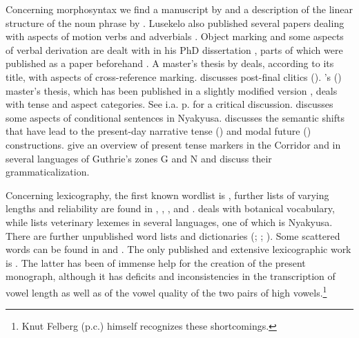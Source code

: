 Concerning morphosyntax we find a manuscript by \citet{DurantiA1977} and a description of the linear structure of the noun phrase by \citet{LusekeloA2009a}. Lusekelo also published several papers dealing with aspects of motion verbs \citep{LusekeloA2008} and adverbials \citep{LusekeloA2010}. Object marking and some aspects of verbal derivation are dealt with in his PhD dissertation \citep{LusekeloA2012}, parts of which were published as a paper beforehand \citep{LusekeloA2008a}. A master's thesis by \citet{HawkinsonA1976} deals, according to its title, with aspects of cross-reference marking. \citet{PersohnB2017a} discusses post-final clitics (). \mbox{\citeauthor{LusekeloA2007}'s} (\citeyear{LusekeloA2007}) master's thesis, which has been published in a slightly modified version \citep{LusekeloA2013}, deals with tense and aspect categories. See i.a. p.\nobreakspace\pageref{FootnoteCriticismLusekelo2013} for a critical discussion. \citet{LusekeloA2016} discusses some aspects of conditional sentences in Nyakyusa. \citet{PersohnB2016} discusses the semantic shifts that have lead to the present-day narrative tense () and modal future () constructions. \citet{PersohnBBernanderR2016} give an overview of present tense markers in the Corridor and in several languages of Guthrie's zones G and N and discuss their grammaticalization.

\newpage
\largerpage[2]
Concerning lexicography, the first known wordlist is \citet{BainJ1891}, further lists of varying lengths and reliability are found in \citet{JohnstonH1897,JohnstonH1977}, \citet{NurseD1979}, \citet{SchumannK1899}, \citet{MerenskyA1894} and \citet{MwangokaNVoorhoeveJ1960c}. \citet{StolzA1934} deals with botanical vocabulary, while \citet{GreenwayP1947} lists veterinary lexemes in several languages, one of which is Nyakyusa. There are further unpublished word lists and dictionaries (\citealt{Anonym1939}; \citealt{BusseJnd}; \citealt{Konter-KataniM1988}). Some scattered words can be found in \citet{WernerA1919} and \citet{WilsonM1958}. The only published and extensive lexicographic work is \citet{FelbergK1996}. The latter has been of immense help for the creation of the present monograph, although it has deficits and inconsistencies in the transcription of vowel length as well as of the vowel quality of the two pairs of high vowels.\footnote{Knut Felberg (p.c.) himself recognizes these shortcomings.} 

